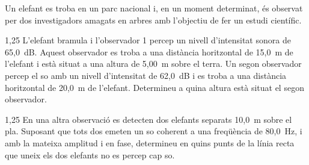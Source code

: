 Un elefant es troba en un parc nacional i, en un moment determinat, és observat per dos investigadors amagats en arbres amb l'objectiu de fer un estudi científic.


\begin{apartat}{1,25}
L'elefant bramula i l'observador 1 percep un nivell d'intensitat sonora de 65,0~dB. Aquest observador es troba a una distància horitzontal de 15,0~m de l'elefant i està situat a una altura de 5,00~m sobre el terra. Un segon observador percep el so amb un nivell d'intensitat de 62,0~dB i es troba a una distància horitzontal de 20,0~m de l'elefant. Determineu a quina altura està situat el segon observador.
\end{apartat}

\begin{apartat}{1,25}
En una altra observació es detecten dos elefants separats 10,0~m sobre el pla. Suposant que tots dos emeten un so coherent a una freqüència de 80,0~Hz, i amb la mateixa amplitud i en fase, determineu en quins punts de la línia recta que uneix els dos elefants no es percep cap so.
\end{apartat}

